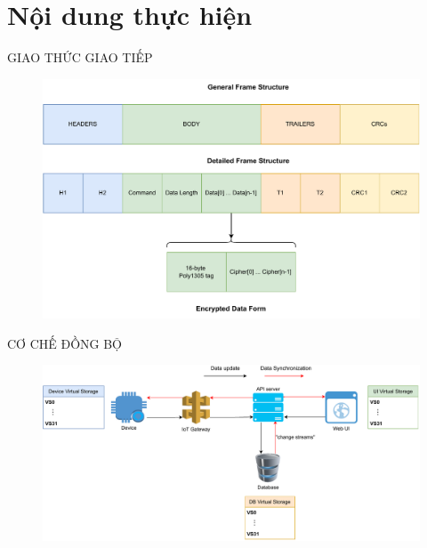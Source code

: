 \section{Nội dung thực hiện}

\begin{frame}{GIAO THỨC GIAO TIẾP}
    \begin{figure}
    	\centering
    	\includegraphics[width=1.0\textwidth,height=.8\textheight]{pic/Presentation-Page-2-Frame-Structure-Overview.pdf}
    \end{figure}
\end{frame}

\begin{frame}{CƠ CHẾ ĐỒNG BỘ}
    \begin{figure}
    	\centering
    	\includegraphics[width=1.0\textwidth]{pic/Presentation-Page-3-sync-mecha.pdf}
    \end{figure}
\end{frame}

